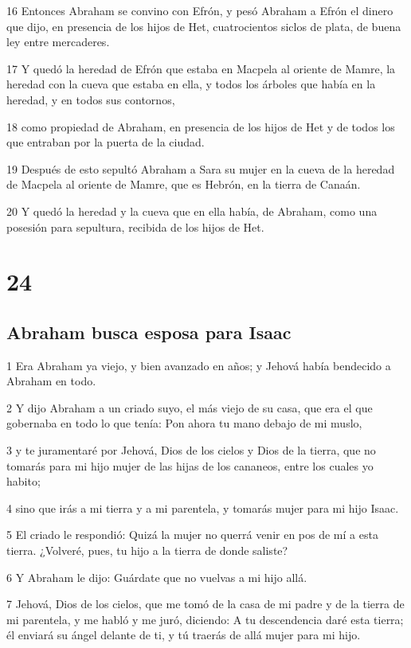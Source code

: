16 Entonces Abraham se convino con Efrón, y pesó Abraham a Efrón el dinero que dijo, en presencia de los hijos de Het, cuatrocientos siclos de plata, de buena ley entre mercaderes.

17 Y quedó la heredad de Efrón que estaba en Macpela al oriente de Mamre, la heredad con la cueva que estaba en ella, y todos los árboles que había en la heredad, y en todos sus contornos,

18 como propiedad de Abraham, en presencia de los hijos de Het y de todos los que entraban por la puerta de la ciudad.

19 Después de esto sepultó Abraham a Sara su mujer en la cueva de la heredad de Macpela al oriente de Mamre, que es Hebrón, en la tierra de Canaán.

20 Y quedó la heredad y la cueva que en ella había, de Abraham, como una posesión para sepultura, recibida de los hijos de Het.

\chapter{24}

\section{Abraham busca esposa para Isaac}

1 Era Abraham ya viejo, y bien avanzado en años; y Jehová había bendecido a Abraham en todo.

2 Y dijo Abraham a un criado suyo, el más viejo de su casa, que era el que gobernaba en todo lo que tenía: Pon ahora tu mano debajo de mi muslo,

3 y te juramentaré por Jehová, Dios de los cielos y Dios de la tierra, que no tomarás para mi hijo mujer de las hijas de los cananeos, entre los cuales yo habito;

4 sino que irás a mi tierra y a mi parentela, y tomarás mujer para mi hijo Isaac.

5 El criado le respondió: Quizá la mujer no querrá venir en pos de mí a esta tierra. ¿Volveré, pues, tu hijo a la tierra de donde saliste?

6 Y Abraham le dijo: Guárdate que no vuelvas a mi hijo allá.

7 Jehová, Dios de los cielos, que me tomó de la casa de mi padre y de la tierra de mi parentela, y me habló y me juró, diciendo: A tu descendencia daré esta tierra; él enviará su ángel delante de ti, y tú traerás de allá mujer para mi hijo.

